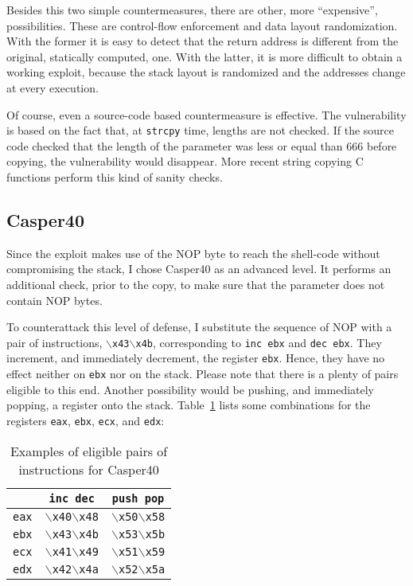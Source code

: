 Besides this two simple countermeasures, there are other, more ``expensive'', possibilities. These are control-flow enforcement and data layout randomization. With the former it is easy to detect that the return address is different from the original, statically computed, one. With the latter, it is more difficult to obtain a working exploit, because the stack layout is randomized and the addresses change at every execution.

Of course, even a source-code based countermeasure is effective. The vulnerability is based on the fact that, at \texttt{strcpy} time, lengths are not checked. If the source code checked that the length of the parameter was less or equal than 666 before copying, the vulnerability would disappear. More recent string copying C functions perform this kind of sanity checks.

\subsection{Casper40}\label{sec:casper40}
Since the exploit makes use of the NOP byte to reach the shell-code without compromising the stack, I chose Casper40 as an advanced level. It performs an additional check, prior to the copy, to make sure that the parameter does not contain NOP bytes. 

To counterattack this level of defense, I substitute the sequence of NOP with a pair of instructions, \texttt{$\backslash$x43$\backslash$x4b}, corresponding to \texttt{inc ebx} and \texttt{dec ebx}. They increment, and immediately decrement, the register \texttt{ebx}. Hence, they have no effect neither on \texttt{ebx} nor on the stack. Please note that there is a plenty of pairs eligible to this end. Another possibility would be pushing, and immediately popping, a register onto the stack. Table~\ref{tbl:casper40} lists some combinations for the registers \texttt{eax}, \texttt{ebx}, \texttt{ecx}, and \texttt{edx}:
\begin{table}[h]
	\centering
	\begin{tabular}{|c|c|c|}
		\hline
		& \texttt{inc dec}                        & \texttt{push pop}                       \\ \hline
		\texttt{eax} & \texttt{$\backslash$x40$\backslash$x48} & \texttt{$\backslash$x50$\backslash$x58} \\ \hline
		\texttt{ebx} & \texttt{$\backslash$x43$\backslash$x4b} & \texttt{$\backslash$x53$\backslash$x5b} \\ \hline
		\texttt{ecx} & \texttt{$\backslash$x41$\backslash$x49} & \texttt{$\backslash$x51$\backslash$x59} \\ \hline
		\texttt{edx} & \texttt{$\backslash$x42$\backslash$x4a} & \texttt{$\backslash$x52$\backslash$x5a} \\ \hline
	\end{tabular}
	\caption{Examples of eligible pairs of instructions for Casper40}
	\label{tbl:casper40}
\end{table}

